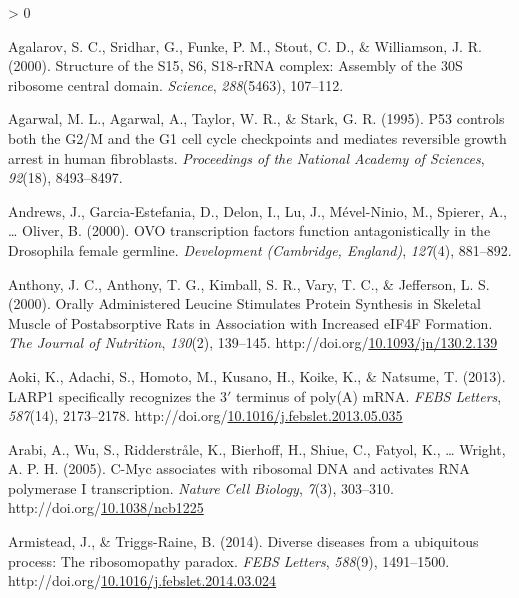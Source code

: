 \documentclass[12pt,oneside]{reedthesis}
\newlength{\cslhangindent}
\newenvironment{CSLReferences}[2] %
 {%
  \setlength{\parindent}{0pt}
  \ifodd #1 \everypar{\setlength{\hangindent}{\cslhangindent}}\ignorespaces\fi
  \ifnum #2 > 0
  \setlength{\parskip}{#2\baselineskip}
  \fi
 }%
 {}
\begin{document}
\hypertarget{refs}{}
\begin{CSLReferences}{1}{0}
\leavevmode\hypertarget{ref-Agalarov2000}{}%
Agalarov, S. C., Sridhar, G., Funke, P. M., Stout, C. D., \& Williamson, J. R. (2000). Structure of the {S15}, {S6}, {S18-rRNA} complex: Assembly of the {30S} ribosome central domain. \emph{Science}, \emph{288}(5463), 107--112.

\leavevmode\hypertarget{ref-Agarwal1995a}{}%
Agarwal, M. L., Agarwal, A., Taylor, W. R., \& Stark, G. R. (1995). P53 controls both the {G2}/{M} and the {G1} cell cycle checkpoints and mediates reversible growth arrest in human fibroblasts. \emph{Proceedings of the National Academy of Sciences}, \emph{92}(18), 8493--8497.

\leavevmode\hypertarget{ref-Andrews2000a}{}%
Andrews, J., Garcia-Estefania, D., Delon, I., Lu, J., Mével-Ninio, M., Spierer, A., \ldots{} Oliver, B. (2000). {OVO} transcription factors function antagonistically in the {Drosophila} female germline. \emph{Development (Cambridge, England)}, \emph{127}(4), 881--892.

\leavevmode\hypertarget{ref-anthonyOrallyAdministeredLeucine2000}{}%
Anthony, J. C., Anthony, T. G., Kimball, S. R., Vary, T. C., \& Jefferson, L. S. (2000). Orally {Administered Leucine Stimulates Protein Synthesis} in {Skeletal Muscle} of {Postabsorptive Rats} in {Association} with {Increased eIF4F Formation}. \emph{The Journal of Nutrition}, \emph{130}(2), 139--145. http://doi.org/\href{https://doi.org/10.1093/jn/130.2.139}{10.1093/jn/130.2.139}

\leavevmode\hypertarget{ref-aokiLARP1SpecificallyRecognizes2013}{}%
Aoki, K., Adachi, S., Homoto, M., Kusano, H., Koike, K., \& Natsume, T. (2013). {LARP1} specifically recognizes the 3{\({'}\)} terminus of poly({A}) {mRNA}. \emph{FEBS Letters}, \emph{587}(14), 2173--2178. http://doi.org/\href{https://doi.org/10.1016/j.febslet.2013.05.035}{10.1016/j.febslet.2013.05.035}

\leavevmode\hypertarget{ref-arabiCMycAssociatesRibosomal2005}{}%
Arabi, A., Wu, S., Ridderstråle, K., Bierhoff, H., Shiue, C., Fatyol, K., \ldots{} Wright, A. P. H. (2005). C-{Myc} associates with ribosomal {DNA} and activates {RNA} polymerase {I} transcription. \emph{Nature Cell Biology}, \emph{7}(3), 303--310. http://doi.org/\href{https://doi.org/10.1038/ncb1225}{10.1038/ncb1225}

\leavevmode\hypertarget{ref-Armistead2014a}{}%
Armistead, J., \& Triggs-Raine, B. (2014). Diverse diseases from a ubiquitous process: {The} ribosomopathy paradox. \emph{FEBS Letters}, \emph{588}(9), 1491--1500. http://doi.org/\href{https://doi.org/10.1016/j.febslet.2014.03.024}{10.1016/j.febslet.2014.03.024}


\end{CSLReferences}
\end{document}
